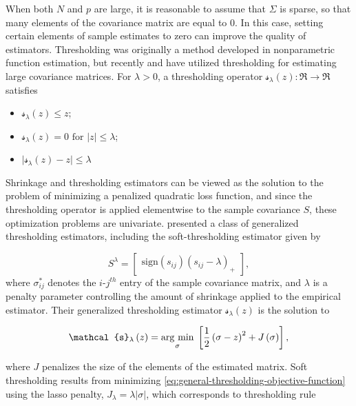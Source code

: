 When both $N$ and $p$ are large, it is reasonable to assume that $\Sigma$ is sparse, so that many elements of the covariance matrix are equal to 0. In this case, setting certain elements of sample estimates to zero can improve the quality of estimators. Thresholding was originally a method developed in nonparametric function estimation, but recently \cite{bickel2008covariance} and \cite{rothman2009generalized} have utilized thresholding for estimating large covariance matrices.  For $\lambda > 0$, a thresholding operator $\mathcal{s}_\lambda\left( z \right): \Re \rightarrow \Re$ satisfies 
\begin{itemize}
\item $\mathcal{s}_\lambda\left( z \right) \le z$;
\item $\mathcal{s}_\lambda\left( z \right) = 0 \mbox{ for } \vert z\vert \le \lambda$;
\item $\vert \mathcal{s}_\lambda\left( z \right) - z \vert \le \lambda$
\end{itemize}

Shrinkage and thresholding estimators can be viewed as the solution to the problem of minimizing a penalized quadratic loss function, and since the thresholding operator is applied elementwise to the sample covariance $S$,  these optimization problems are univariate. \cite{rothman2009generalized} presented a class of generalized thresholding estimators, including the soft-thresholding estimator given by

\[
S^{\lambda}=   \begin{bmatrix} \mbox{sign}\left(s_{ij}\right) \left(s_{ij} - \lambda\right)_+ \end{bmatrix},
\]
\noindent 
where $\sigma^*_{ij}$ denotes the $i$-$j^{th}$ entry of the sample covariance matrix, and $\lambda$ is a penalty parameter controlling the amount of shrinkage applied to the empirical estimator.  Their generalized thresholding estimator $\mathcal{s}_\lambda\left( z \right)$ is the solution to

\begin{equation} \label{eq:general-thresholding-objective-function}
\mathcal{s}_\lambda\left( z \right)  = \argmin{\sigma} \left[ \frac{1}{2} \left(\sigma - z\right)^2 + J\left(\sigma \right)\right],
\end{equation}

\noindent
where $J$ penalizes the size of the elements of the estimated matrix. Soft thresholding results from minimizing \ref{eq:general-thresholding-objective-function} using the lasso penalty, $J_\lambda = \lambda \vert \sigma \vert$, which corresponds to thresholding rule

